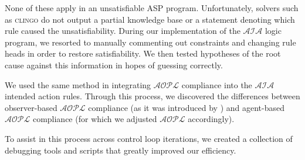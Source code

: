 None of these apply in an unsatisfiable ASP program.
Unfortunately, solvers such as \textsc{clingo} do not output a partial knowledge base or a statement denoting which rule caused the unsatisfiability.
During our implementation of the $\mathcal{AIA}$ logic program, we resorted to manually commenting out constraints and changing rule heads in order to restore satisfiability.
We then tested hypotheses of the root cause against this information in hopes of guessing correctly.

We used the same method in integrating $\mathcal{AOPL}$ compliance into the $\mathcal{AIA}$ intended action rules.
Through this process, we discovered the differences between observer-based $\mathcal{AOPL}$ compliance (as it was introduced by \citet{gelfond_authorization_2008}) and agent-based $\mathcal{AOPL}$ compliance (for which we adjusted $\mathcal{AOPL}$ accordingly).

To assist in this process across control loop iterations, we created a collection of debugging tools and scripts that greatly improved our efficiency.
